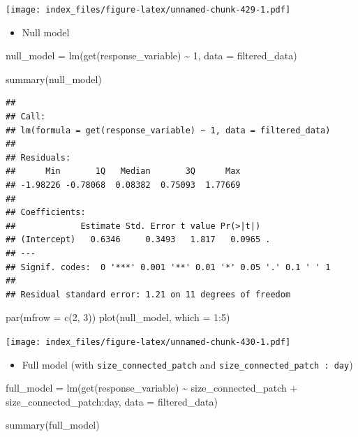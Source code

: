 \documentclass[
]{article}
\newenvironment{Shaded}{\begin{snugshade}}{\end{snugshade}}
\newcommand{\AttributeTok}[1]{\textcolor[rgb]{0.77,0.63,0.00}{#1}}
\newcommand{\DecValTok}[1]{\textcolor[rgb]{0.00,0.00,0.81}{#1}}
\newcommand{\FunctionTok}[1]{\textcolor[rgb]{0.00,0.00,0.00}{#1}}
\newcommand{\NormalTok}[1]{#1}
\newcommand{\OtherTok}[1]{\textcolor[rgb]{0.56,0.35,0.01}{#1}}
\newcommand{\SpecialCharTok}[1]{\textcolor[rgb]{0.00,0.00,0.00}{#1}}
\providecommand{\tightlist}{%
  \setlength{\itemsep}{0pt}\setlength{\parskip}{0pt}}
\begin{document}
\texttt{[image: index\_files/figure-latex/unnamed-chunk-429-1.pdf]}

\begin{itemize}
\tightlist
\item
  Null model
\end{itemize}

\begin{Shaded}
\begin{Highlighting}[]
\NormalTok{null\_model }\OtherTok{=} \FunctionTok{lm}\NormalTok{(}\FunctionTok{get}\NormalTok{(response\_variable) }\SpecialCharTok{\textasciitilde{}}
                  \DecValTok{1}\NormalTok{,}
                \AttributeTok{data =}\NormalTok{ filtered\_data)}

\FunctionTok{summary}\NormalTok{(null\_model)}
\end{Highlighting}
\end{Shaded}

\begin{verbatim}
## 
## Call:
## lm(formula = get(response_variable) ~ 1, data = filtered_data)
## 
## Residuals:
##      Min       1Q   Median       3Q      Max 
## -1.98226 -0.78068  0.08382  0.75093  1.77669 
## 
## Coefficients:
##             Estimate Std. Error t value Pr(>|t|)  
## (Intercept)   0.6346     0.3493   1.817   0.0965 .
## ---
## Signif. codes:  0 '***' 0.001 '**' 0.01 '*' 0.05 '.' 0.1 ' ' 1
## 
## Residual standard error: 1.21 on 11 degrees of freedom
\end{verbatim}

\begin{Shaded}
\begin{Highlighting}[]
\FunctionTok{par}\NormalTok{(}\AttributeTok{mfrow =} \FunctionTok{c}\NormalTok{(}\DecValTok{2}\NormalTok{, }\DecValTok{3}\NormalTok{))}
\FunctionTok{plot}\NormalTok{(null\_model, }\AttributeTok{which =} \DecValTok{1}\SpecialCharTok{:}\DecValTok{5}\NormalTok{)}
\end{Highlighting}
\end{Shaded}

\texttt{[image: index\_files/figure-latex/unnamed-chunk-430-1.pdf]}

\begin{itemize}
\tightlist
\item
  Full model (with \texttt{size\_connected\_patch} and
  \texttt{size\_connected\_patch\ :\ day})
\end{itemize}

\begin{Shaded}
\begin{Highlighting}[]
\NormalTok{full\_model }\OtherTok{=} \FunctionTok{lm}\NormalTok{(}\FunctionTok{get}\NormalTok{(response\_variable) }\SpecialCharTok{\textasciitilde{}}
\NormalTok{                  size\_connected\_patch }\SpecialCharTok{+}
\NormalTok{                  size\_connected\_patch}\SpecialCharTok{:}\NormalTok{day,}
                \AttributeTok{data =}\NormalTok{ filtered\_data)}

\FunctionTok{summary}\NormalTok{(full\_model)}
\end{Highlighting}
\end{Shaded}
\end{document}
